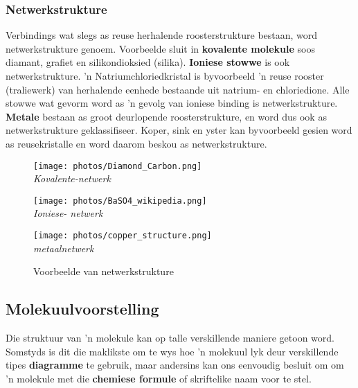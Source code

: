 \subsubsection*{Netwerkstrukture}
Verbindings wat slegs as reuse herhalende roosterstrukture bestaan, word netwerkstrukture genoem. Voorbeelde sluit in \textbf{kovalente molekule} soos diamant, grafiet en silikondioksied (silika). \textbf{Ioniese stowwe} is ook netwerkstrukture. 'n Natriumchloriedkristal is byvoorbeeld  'n reuse rooster (traliewerk) van herhalende eenhede bestaande uit natrium- en chloriedione. Alle stowwe wat gevorm word as 'n gevolg van ioniese binding is netwerkstrukture. \textbf{Metale} bestaan as groot deurlopende roosterstrukture, en word dus ook as netwerkstrukture geklassifiseer. Koper, sink en yster kan byvoorbeeld gesien word as reusekristalle en word daarom beskou as netwerkstrukture.


\begin{figure}[H]
  \begin{center}
  \begin{minipage}[c]{5 cm}
    \texttt{[image: photos/Diamond\_Carbon.png]} \\
    \textsl{Kovalente-netwerk}
  \end{minipage}
  \begin{minipage}[c]{5 cm}
    \texttt{[image: photos/BaSO4\_wikipedia.png]}  \\ 
    \textsl{Ioniese- netwerk}
  \end{minipage}
  \begin{minipage}[c]{5 cm}
    \texttt{[image: photos/copper\_structure.png]}   \\ 
    \textsl{metaalnetwerk}
  \end{minipage}
\caption{Voorbeelde van netwerkstrukture}
\end{center}
\end{figure}
            \subsection*{Molekuulvoorstelling}
            \nopagebreak
        \label{m38120*id307557}
Die struktuur van 'n molekule kan op talle verskillende maniere getoon word. Somstyds is dit die maklikste om te wys hoe 'n molekuul lyk deur verskillende tipes \textbf{diagramme} te gebruik, maar andersins kan ons eenvoudig besluit om om 'n molekule met die \textbf{chemiese formule} of skriftelike naam voor te stel.\par 
